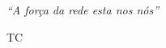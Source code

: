 \documentclass[a4paper, 11pt, oneside]{Relatorio_sem_2}  %
\begin{document}



\clearpage  %

\pagestyle{empty} %

\null\vfill
\textit{``A força da rede esta nos nós''}

\begin{flushright}
TC
\end{flushright}

\vfill\vfill\vfill\vfill\vfill\vfill\null
\clearpage  %

\pagestyle{fancy}  %











\backmatter
\nocite{*}
\label{Bibliography}
\end{document}
